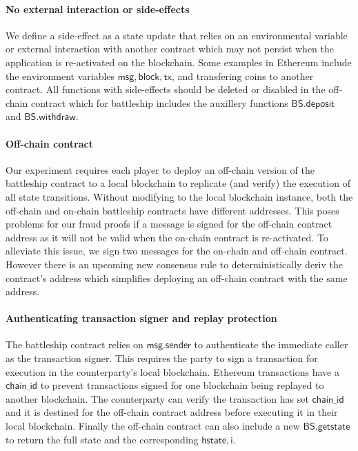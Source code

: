 \documentclass{llncs}
\newcommand{\hstate}{\mathsf{hstate}}
\newcommand{\monotoniccounter}{\mathsf{i}}
\newcommand{\battleshipdeposit}{\mathsf{BS.deposit}}
\newcommand{\battleshipwithdraw}{\mathsf{BS.withdraw}}
\newcommand{\battleshipgetstate}{\mathsf{BS.getstate}}
\begin{document}
	\paragraph{No external interaction or side-effects}   \label{sec:sideffectshandle}
	We define a side-effect as a state update that relies on an environmental variable or external interaction with another contract which may not persist when the application is re-activated on the blockchain. 
	Some examples in Ethereum include the environment variables $\mathsf{msg}, \mathsf{block}, \mathsf{tx}$, and transfering coins to another contract. 
	All functions with side-effects should be deleted or disabled in the off-chain contract which for battleship includes the auxillery functions $\battleshipdeposit$ and $\battleshipwithdraw$.  

	

	\paragraph{Off-chain contract}

	Our experiment requires each player to deploy an off-chain version of the battleship contract to a local blockchain to replicate (and verify) the execution of all state transitions. 
	Without modifying to the local blockchain instance, both the off-chain and on-chain battleship contracts have different addresses.
	This poses problems for our fraud proofs if a message is signed for the off-chain contract address as it will not be valid when the on-chain contract is re-activated.
	To alleviate this issue, we sign two messages for the on-chain and off-chain contract.
	However there is an upcoming new consensus rule  \cite{eip1014} to deterministically deriv the contract's address which simplifies deploying an off-chain contract with the same address. 
	
	\paragraph{Authenticating transaction signer and replay protection} 
	The battleship contract relies on $\mathsf{msg.sender}$ to authenticate the immediate caller as the transaction signer.
	This requires the party to sign a transaction for execution in the counterparty's local blockchain. 
	Ethereum transactions have a $\mathsf{chain\_id}$ to prevent transactions signed for one blockchain being replayed to another blockchain.
	The counterparty can verify the transaction has set  $\mathsf{chain\_id}$  and it is destined for the off-chain contract address before executing it in their local blockchain. 
	Finally the off-chain contract can also include a new $\battleshipgetstate$ to return the full state and the corresponding $\hstate,\monotoniccounter$. 
\end{document}
